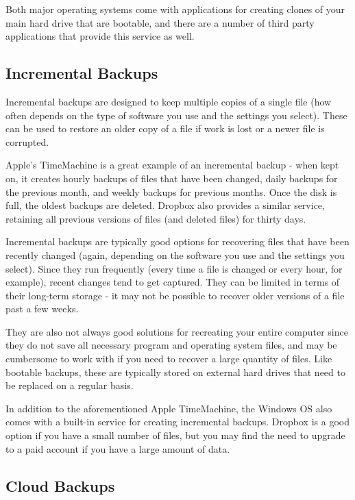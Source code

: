 \documentclass[]{book}
\theoremstyle{definition}
\theoremstyle{definition}
\theoremstyle{definition}
\theoremstyle{remark}
\begin{document}
Both major operating systems come with applications for creating clones
of your main hard drive that are bootable, and there are a number of
third party applications that provide this service as well.

\subsection{Incremental Backups}\label{incremental-backups}

Incremental backups are designed to keep multiple copies of a single
file (how often depends on the type of software you use and the settings
you select). These can be used to restore an older copy of a file if
work is lost or a newer file is corrupted.

Apple's TimeMachine is a great example of an incremental backup - when
kept on, it creates hourly backups of files that have been changed,
daily backups for the previous month, and weekly backups for previous
months. Once the disk is full, the oldest backups are deleted. Dropbox
also provides a similar service, retaining all previous versions of
files (and deleted files) for thirty days.

Incremental backups are typically good options for recovering files that
have been recently changed (again, depending on the software you use and
the settings you select). Since they run frequently (every time a file
is changed or every hour, for example), recent changes tend to get
captured. They can be limited in terms of their long-term storage - it
may not be possible to recover older versions of a file past a few
weeks.

They are also not always good solutions for recreating your entire
computer since they do not save all necessary program and operating
system files, and may be cumbersome to work with if you need to recover
a large quantity of files. Like bootable backups, these are typically
stored on external hard drives that need to be replaced on a regular
basis.

In addition to the aforementioned Apple TimeMachine, the Windows OS also
comes with a built-in service for creating incremental backups. Dropbox
is a good option if you have a small number of files, but you may find
the need to upgrade to a paid account if you have a large amount of
data.

\subsection{Cloud Backups}\label{cloud-backups}
\end{document}
